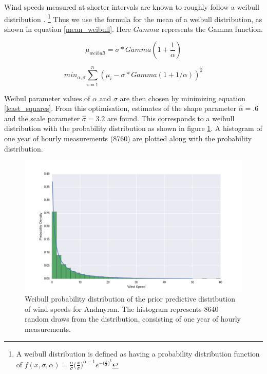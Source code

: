 \documentclass[11pt]{article}
\begin{document}
Wind speeds measured at shorter intervals are known to roughly follow a weibull distribution \citep{weibull_statistical_1951}. \footnote{A weibull distribution is defined as having a probability distribution function of $f(x, \sigma, \alpha) = \frac{\alpha}{\sigma} \big(\frac{x}{\sigma}\big)^{\alpha-1} e^{-\big(\frac{x}{\sigma}\big)^k}$} Thus we use the formula for the mean of a weibull distribution, as shown in equation \ref{mean_weibull}. Here $Gamma$ represents the Gamma function.

\begin{equation}
\mu_{weibull} = \sigma*Gamma(1+\frac{1}{\alpha})
\label{mean_weibull}
\end{equation}

\begin{equation}
min_{\alpha,\sigma} \sum_{i=1}^n (\mu_i - \sigma*Gamma(1+1/\alpha))^2
\label{least_squares}
\end{equation}

Weibul parameter values of $\alpha$ and $\sigma$ are then chosen by minimizing equation \ref{least_squares}. From this optimisation, estimates of the shape parameter $\hat{\alpha} = .6$ and the scale parameter $\hat{\sigma} = 3.2$ are found.  This corresponds to a weibull distribution with the probability distribution as shown in figure \ref{weibull_distribution}. A histogram of one year of hourly measurements (8760) are plotted along with the probability distribution. 

\begin{figure}
	\includegraphics[width=1\textwidth]{figures/prior_distribution.png}
	\caption{Weibull probability distribution of the prior predictive distribution of wind speeds for Andmyran. The histogram represents 8640 random draws from the distribution, consisting of one year of hourly measurements.}
	\label{weibull_distribution}
\end{figure}
\end{document}
